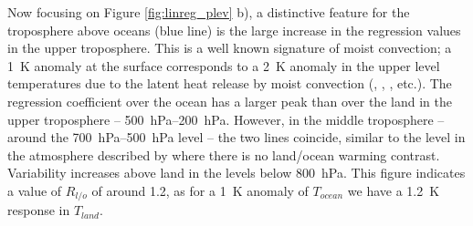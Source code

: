 Now focusing on Figure \ref{fig:linreg_plev} b), a distinctive feature for the 
troposphere above oceans (blue line) is the large increase in the regression 
values in the upper troposphere. This is a well known signature of moist
convection; a \SI{1}{\kelvin} anomaly at the surface corresponds to a 
\SI{2}{\kelvin} anomaly in the upper level temperatures due to the latent heat 
release by moist convection (\citealt{Joshi2007}, \citealt{Dommenget2009}, 
\citealt{Byrne2013}, etc.).  The regression coefficient over the ocean has a 
larger peak than over the land in the upper troposphere --  
\SIrange{500}{200}{\hecto\pascal}.  However, in the middle troposphere -- around 
the \SIrange{700}{500}{\hecto\pascal} level -- the two lines coincide, similar 
to the level in the atmosphere described by \citet{Joshi2007} where there is no 
land/ocean warming contrast. Variability increases above land in the levels 
below \SI{800}{\hecto\pascal}.  This figure indicates a value of $R_{l/o}$ of 
around 1.2, as for a \SI{1}{\kelvin} anomaly of $T_{ocean}$ we have a 
\SI{1.2}{\kelvin} response in $T_{land}$.  

